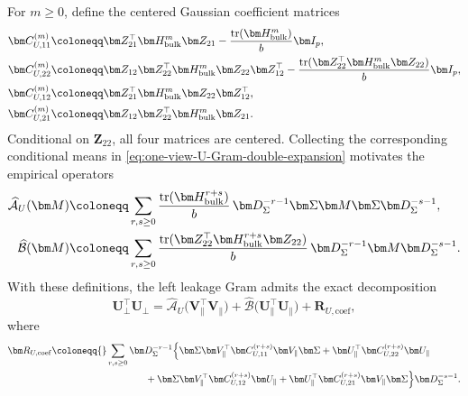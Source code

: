 \documentclass[11pt]{article}
\newcommand{\trans}{\top}
\DeclareMathOperator{\tr}{tr}
\begin{document}
For $m\ge0$, define the centered Gaussian coefficient matrices
\begin{subequations}
\label{eq:one-view-U-centered-coefficients}
\begin{align}
  \bm C_{U,11}^{(m)}
  &\coloneqq
  \bm Z_{21}^\trans\bm H_{\rm bulk}^m\bm Z_{21}
  -
  \frac{\tr(\bm H_{\rm bulk}^m)}{b}\bm I_p,
  \label{eq:one-view-U-core-11}\\
  \bm C_{U,22}^{(m)}
  &\coloneqq
  \bm Z_{12}\bm Z_{22}^\trans\bm H_{\rm bulk}^m\bm Z_{22}\bm Z_{12}^\trans
  -
  \frac{\tr(\bm Z_{22}^\trans\bm H_{\rm bulk}^m\bm Z_{22})}{b}\bm I_p,
  \label{eq:one-view-U-core-22}\\
  \bm C_{U,12}^{(m)}
  &\coloneqq
  \bm Z_{21}^\trans\bm H_{\rm bulk}^m\bm Z_{22}\bm Z_{12}^\trans,
  \label{eq:one-view-U-core-12}\\
  \bm C_{U,21}^{(m)}
  &\coloneqq
  \bm Z_{12}\bm Z_{22}^\trans\bm H_{\rm bulk}^m\bm Z_{21}.
  \label{eq:one-view-U-core-21}
\end{align}
\end{subequations}
Conditional on $\bm Z_{22}$, all four matrices are centered.  Collecting the
corresponding conditional means in
\cref{eq:one-view-U-Gram-double-expansion} motivates the empirical operators
\begin{subequations}
\begin{align}
  \widehat{\mathcal A}_U(\bm M)
  &\coloneqq
  \sum_{r,s\ge0}
  \frac{\tr(\bm H_{\rm bulk}^{r+s})}{b}\,
  \bm D_\Sigma^{-r-1}
  \bm\Sigma\bm M\bm\Sigma
  \bm D_\Sigma^{-s-1},
  \label{eq:one-view-empirical-AU}\\
  \widehat{\mathcal B}(\bm M)
  &\coloneqq
  \sum_{r,s\ge0}
  \frac{\tr(\bm Z_{22}^\trans\bm H_{\rm bulk}^{r+s}\bm Z_{22})}{b}\,
  \bm D_\Sigma^{-r-1}\bm M\bm D_\Sigma^{-s-1}.
  \label{eq:one-view-empirical-B}
\end{align}
\end{subequations}
With these definitions, the left leakage Gram admits the exact decomposition
\begin{equation}
\label{eq:one-view-empirical-U-Gram}
  {\bm U_\perp^\trans\bm U_\perp
  =
  \widehat{\mathcal A}_U
  \bigl(
    \bm V_\parallel^\trans\bm V_\parallel
  \bigr)
  +
  \widehat{\mathcal B}
  \bigl(
    \bm U_\parallel^\trans\bm U_\parallel
  \bigr)
  +
  \bm R_{U,\mathrm{coef}},}
\end{equation}
where
\begin{equation}
\label{eq:one-view-RU-coef}
\begin{aligned}
  \bm R_{U,\mathrm{coef}}
  \coloneqq{}&
  \sum_{r,s\ge0}
  \bm D_\Sigma^{-r-1}
  \Bigl\{
    \bm\Sigma\bm V_\parallel^\trans
    \bm C_{U,11}^{(r+s)}
    \bm V_\parallel\bm\Sigma
    +
    \bm U_\parallel^\trans
    \bm C_{U,22}^{(r+s)}
    \bm U_\parallel
  \\
  &\qquad\qquad
    +
    \bm\Sigma\bm V_\parallel^\trans
    \bm C_{U,12}^{(r+s)}
    \bm U_\parallel
    +
    \bm U_\parallel^\trans
    \bm C_{U,21}^{(r+s)}
    \bm V_\parallel\bm\Sigma
  \Bigr\}
  \bm D_\Sigma^{-s-1}.
\end{aligned}
\end{equation}
\end{document}
